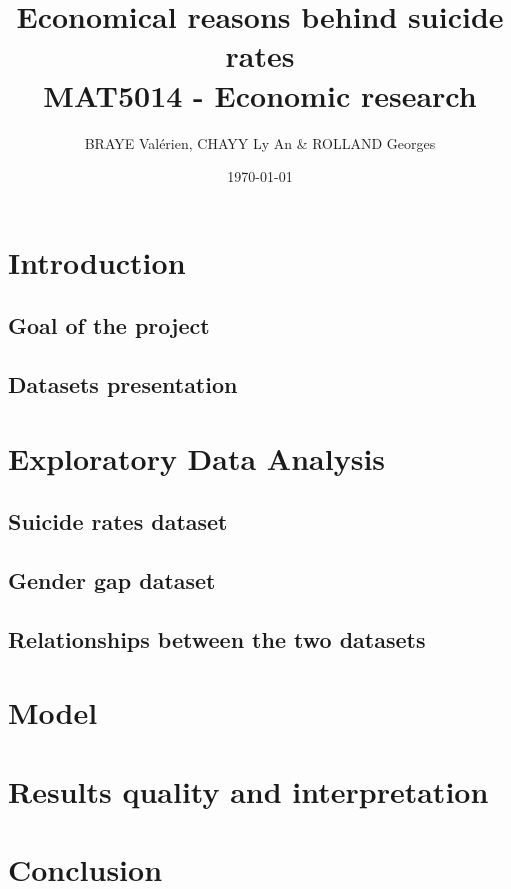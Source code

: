 \documentclass{article}
\title{Economical reasons behind suicide rates\\\small{MAT5014 - Economic research}}
\author{BRAYE Valérien, CHAYY Ly An \& ROLLAND Georges}
\date{\today}
\begin{document}
\createintro

\section{Introduction}
\label{sec:introduction}

\subsection{Goal of the project}
\label{sec:introduction_goal}

\subsection{Datasets presentation}
\label{sec:introduction_data_presentation}

\section{Exploratory Data Analysis}
\label{sec:dataset_eda}

\subsection{Suicide rates dataset}
\label{sec:eda_suicides}

\subsection{Gender gap dataset}
\label{sec:eda_gender}

\subsection{Relationships between the two datasets}
\label{sec:eda_relationships}

\section{Model}
\label{sec:model}

\section{Results quality and interpretation}
\label{sec:results}

\section{Conclusion}
\label{sec:conclusion}
\end{document}
